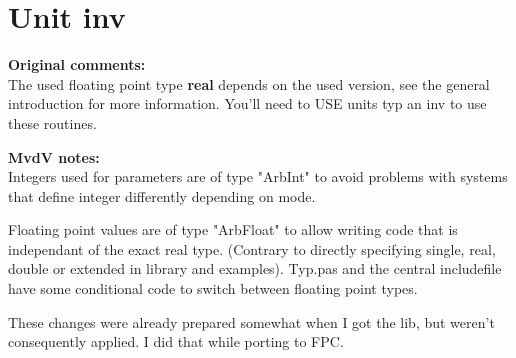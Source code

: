 \documentclass{report}
\begin{document}
\section{Unit inv}

\textbf{Original comments:} \\ 
The used floating point type \textbf{real} depends on the used version,
see the general introduction for more information. You'll need to USE
units typ an inv to use these routines. 

\textbf{MvdV notes:} \\
Integers used for parameters are of type "ArbInt" to avoid problems with
systems that define integer differently depending on mode. 

Floating point values are of type "ArbFloat" to allow writing code that is
independant of the exact real type. (Contrary to directly specifying single,
real, double or extended in library and examples). Typ.pas and the central
includefile have some conditional code to switch between floating point
types.

These changes were already prepared somewhat when I got the lib, but weren't
consequently applied. I did that while porting to FPC.
\end{document}
